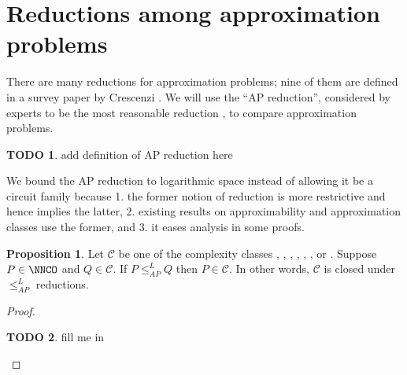 \documentclass[]{article}
\theoremstyle{definition} \newtheorem{definition}{Definition}
\theoremstyle{definition} \newtheorem{openquestion}{Open question}
\newtheorem{proposition}{Proposition}
\newtheorem{todo}{TODO}
\newcommand{\Er}{\leq_E^{L}}
\newcommand{\APr}{\leq_{AP}^{L}}
\begin{document}
\section{Reductions among approximation problems}

There are many reductions for approximation problems; nine of them are defined in a survey paper by Crescenzi \cite{crescenzi97}.
We will use the ``AP reduction'', considered by experts to be the most reasonable reduction \cite[Section~8.6]{acgkmp99}, to compare approximation problems.

\begin{todo}
  add definition of AP reduction here
\end{todo}

We bound the AP reduction to logarithmic space instead of allowing it be a \FNC{} circuit family because 1. the former notion of reduction is more restrictive and hence implies the latter, 2. existing results on approximability and approximation classes use the former, and 3. it eases analysis in some proofs.


\begin{proposition}
  Let $\mathcal{C}$ be one of the complexity classes \NCO, \NCAS, \ApxNCO, \logApxNCO, \polyApxNCO, \expApxNCO, or \NNCO.
  Suppose $P\in\NNCO$ and $Q\in\mathcal{C}$.
  If $P\APr Q$ then $P\in \mathcal{C}$.
  In other words, $\mathcal{C}$ is closed under $\APr$ reductions.
\end{proposition}
\begin{proof}
  \begin{todo}
    fill me in
  \end{todo}
\end{proof}
\end{document}
